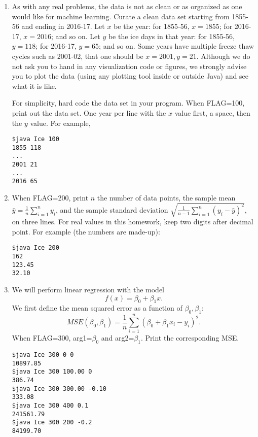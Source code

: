 \documentclass{article}
\begin{document}
\begin{enumerate}
\item
As with any real problems, the data is not as clean or as organized as one would like for machine learning.
Curate a clean data set starting from 1855-56 and ending in 2016-17.
Let $x$ be the year: for 1855-56, $x=1855$; for 2016-17, $x=2016$; and so on.
Let $y$ be the ice days in that year: for 1855-56, $y=118$; for 2016-17, $y=65$; and so on.
Some years have multiple freeze thaw cycles such as 2001-02, that one should be $x=2001, y=21$.
Although we do not ask you to hand in any visualization code or figures, we strongly advise you to plot the data (using any plotting tool inside or outside Java) and see what it is like.

For simplicity, hard code the data set in your program.
When FLAG=100, print out the data set.  One year per line with the $x$ value first, a space, then the $y$ value.
For example,
\begin{verbatim}
$java Ice 100
1855 118
...
2001 21
...
2016 65
\end{verbatim}

\item
When FLAG=200, print $n$ the number of data points,  the sample mean $\bar y=\frac{1}{n}\sum_{i=1}^n y_i$, and the sample standard deviation $\sqrt{\frac{1}{n-1}\sum_{i=1}^n (y_i-\bar y)^2}$, on three lines.  
For real values in this homework, keep two digits after decimal point.
For example (the numbers are made-up):
\begin{verbatim}
$java Ice 200
162
123.45
32.10
\end{verbatim}

\item
We will perform linear regression with the model
$$f(x) = \beta_0 + \beta_1 x.$$
We first define the mean squared error as a function of $\beta_0, \beta_1$:
$$MSE(\beta_0, \beta_1) = \frac{1}{n} \sum_{i=1}^n (\beta_0 + \beta_1 x_i - y_i)^2.$$
When FLAG=300, arg1=$\beta_0$ and arg2=$\beta_1$.
Print the corresponding MSE.
\begin{verbatim}
$java Ice 300 0 0
10897.85
$java Ice 300 100.00 0
386.74
$java Ice 300 300.00 -0.10
333.08
$java Ice 300 400 0.1
241561.79
$java Ice 300 200 -0.2 
84199.70
\end{verbatim}


\end{enumerate}
\end{document}
